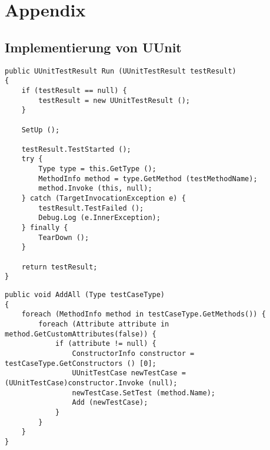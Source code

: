 \chapter{Appendix}

\section{Implementierung von UUnit}

\begin{lstlisting}[caption={[Quellcode der \textit{Run}-Methode von \textit{UUnitTestCase}]Quellcode der \textit{Run}-Methode von \textit{UUnitTestCase}}, label=code:UUnitTestCase_Run]
public UUnitTestResult Run (UUnitTestResult testResult)
{
	if (testResult == null) {
		testResult = new UUnitTestResult ();
	}
	
	SetUp ();
	
	testResult.TestStarted ();
	try {
		Type type = this.GetType ();
		MethodInfo method = type.GetMethod (testMethodName);
		method.Invoke (this, null);
	} catch (TargetInvocationException e) {
		testResult.TestFailed ();
		Debug.Log (e.InnerException);
	} finally {
		TearDown ();
	}
	
	return testResult;
}
\end{lstlisting}
\clearpage

\begin{lstlisting}[caption={[Quellcode der \textit{AddAll}-Methode von \textit{UUnitTestSuite}]Quellcode der \textit{AddAll}-Methode von \textit{UUnitTestSuite}}, label=code:UUnitTestSuite_AddAll]
public void AddAll (Type testCaseType)
{
	foreach (MethodInfo method in testCaseType.GetMethods()) {
		foreach (Attribute attribute in method.GetCustomAttributes(false)) {
			if (attribute != null) {
				ConstructorInfo constructor = testCaseType.GetConstructors () [0];
				UUnitTestCase newTestCase = (UUnitTestCase)constructor.Invoke (null);
				newTestCase.SetTest (method.Name);
				Add (newTestCase);
			}
		}
	}
}
\end{lstlisting}